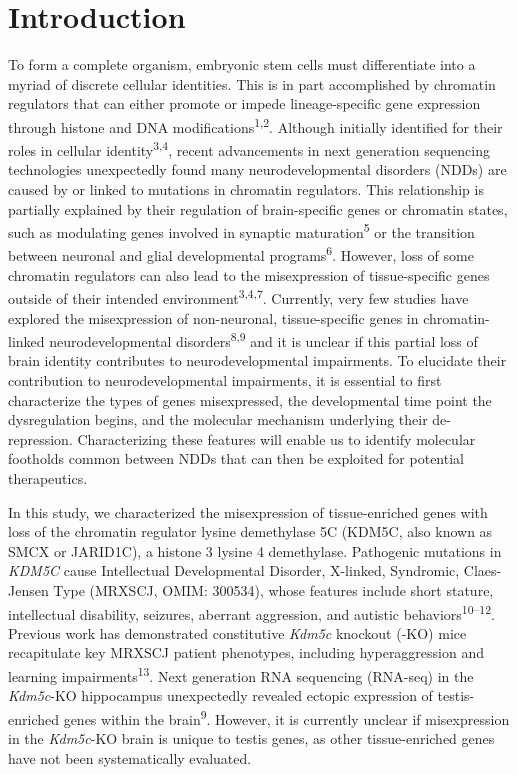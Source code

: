 \documentclass[
]{article}
\begin{document}
\hypertarget{introduction}{%
\section{Introduction}\label{introduction}}

To form a complete organism, embryonic stem cells must differentiate
into a myriad of discrete cellular identities. This is in part
accomplished by chromatin regulators that can either promote or impede
lineage-specific gene expression through histone and DNA
modifications\textsuperscript{1,2}. Although initially identified for
their roles in cellular identity\textsuperscript{3,4}, recent
advancements in next generation sequencing technologies unexpectedly
found many neurodevelopmental disorders (NDDs) are caused by or linked
to mutations in chromatin regulators. This relationship is partially
explained by their regulation of brain-specific genes or chromatin
states, such as modulating genes involved in synaptic
maturation\textsuperscript{5} or the transition between neuronal and
glial developmental programs\textsuperscript{6}. However, loss of some
chromatin regulators can also lead to the misexpression of
tissue-specific genes outside of their intended
environment\textsuperscript{3,4,7}. Currently, very few studies have
explored the misexpression of non-neuronal, tissue-specific genes in
chromatin-linked neurodevelopmental disorders\textsuperscript{8,9} and
it is unclear if this partial loss of brain identity contributes to
neurodevelopmental impairments. To elucidate their contribution to
neurodevelopmental impairments, it is essential to first characterize
the types of genes misexpressed, the developmental time point the
dysregulation begins, and the molecular mechanism underlying their
de-repression. Characterizing these features will enable us to identify
molecular footholds common between NDDs that can then be exploited for
potential therapeutics.

In this study, we characterized the misexpression of tissue-enriched
genes with loss of the chromatin regulator lysine demethylase 5C (KDM5C,
also known as SMCX or JARID1C), a histone 3 lysine 4 demethylase.
Pathogenic mutations in \emph{KDM5C} cause Intellectual Developmental
Disorder, X-linked, Syndromic, Claes-Jensen Type (MRXSCJ, OMIM: 300534),
whose features include short stature, intellectual disability, seizures,
aberrant aggression, and autistic behaviors\textsuperscript{10--12}.
Previous work has demonstrated constitutive \emph{Kdm5c} knockout (-KO)
mice recapitulate key MRXSCJ patient phenotypes, including
hyperaggression and learning impairments\textsuperscript{13}. Next
generation RNA sequencing (RNA-seq) in the \emph{Kdm5c}-KO hippocampus
unexpectedly revealed ectopic expression of testis-enriched genes within
the brain\textsuperscript{9}. However, it is currently unclear if
misexpression in the \emph{Kdm5c}-KO brain is unique to testis genes, as
other tissue-enriched genes have not been systematically evaluated.
\end{document}
